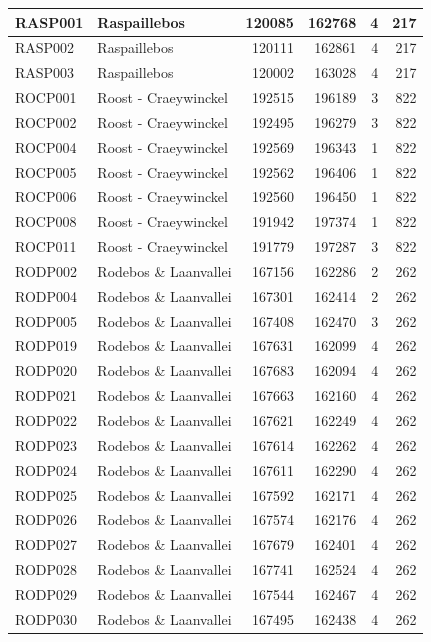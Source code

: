 \documentclass[11pt,]{book}
\begin{document}
\begin{table}
\begin{tabular}[t]{l|l|r|r|r|r}
\hline
RASP001 & Raspaillebos & 120085 & 162768 & 4 & 217\\
\hline
RASP002 & Raspaillebos & 120111 & 162861 & 4 & 217\\
\hline
RASP003 & Raspaillebos & 120002 & 163028 & 4 & 217\\
\hline
ROCP001 & Roost - Craeywinckel & 192515 & 196189 & 3 & 822\\
\hline
ROCP002 & Roost - Craeywinckel & 192495 & 196279 & 3 & 822\\
\hline
ROCP004 & Roost - Craeywinckel & 192569 & 196343 & 1 & 822\\
\hline
ROCP005 & Roost - Craeywinckel & 192562 & 196406 & 1 & 822\\
\hline
ROCP006 & Roost - Craeywinckel & 192560 & 196450 & 1 & 822\\
\hline
ROCP008 & Roost - Craeywinckel & 191942 & 197374 & 1 & 822\\
\hline
ROCP011 & Roost - Craeywinckel & 191779 & 197287 & 3 & 822\\
\hline
RODP002 & Rodebos \& Laanvallei & 167156 & 162286 & 2 & 262\\
\hline
RODP004 & Rodebos \& Laanvallei & 167301 & 162414 & 2 & 262\\
\hline
RODP005 & Rodebos \& Laanvallei & 167408 & 162470 & 3 & 262\\
\hline
RODP019 & Rodebos \& Laanvallei & 167631 & 162099 & 4 & 262\\
\hline
RODP020 & Rodebos \& Laanvallei & 167683 & 162094 & 4 & 262\\
\hline
RODP021 & Rodebos \& Laanvallei & 167663 & 162160 & 4 & 262\\
\hline
RODP022 & Rodebos \& Laanvallei & 167621 & 162249 & 4 & 262\\
\hline
RODP023 & Rodebos \& Laanvallei & 167614 & 162262 & 4 & 262\\
\hline
RODP024 & Rodebos \& Laanvallei & 167611 & 162290 & 4 & 262\\
\hline
RODP025 & Rodebos \& Laanvallei & 167592 & 162171 & 4 & 262\\
\hline
RODP026 & Rodebos \& Laanvallei & 167574 & 162176 & 4 & 262\\
\hline
RODP027 & Rodebos \& Laanvallei & 167679 & 162401 & 4 & 262\\
\hline
RODP028 & Rodebos \& Laanvallei & 167741 & 162524 & 4 & 262\\
\hline
RODP029 & Rodebos \& Laanvallei & 167544 & 162467 & 4 & 262\\
\hline
RODP030 & Rodebos \& Laanvallei & 167495 & 162438 & 4 & 262\\

\end{tabular}
\end{table}
\end{document}
